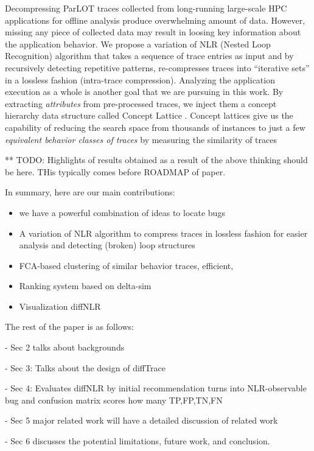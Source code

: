 %
Decompressing ParLOT traces collected from long-running large-scale HPC applications for offline analysis produce overwhelming amount of data. However, missing any piece of collected data may result in loosing key information about the application behavior.
%
We propose a variation of NLR (Nested Loop Recognition) algorithm \cite{Ketterlin-nlr} that takes a sequence of trace entries as input and by recursively detecting repetitive patterns, re-compresses traces into ``iterative sets'' in a lossless fashion (intra-trace compression).  
%
Analyzing the application execution as a whole is another goal that we are pursuing in this work. 
%
By extracting \textit{attributes} from pre-processed traces, we inject them a concept hierarchy data structure called Concept Lattice \cite{clbook}.  
%
Concept lattices give us the capability of reducing the search space from thousands of instances to just a few \textit{equivalent behavior classes of traces} by measuring the similarity of traces\cite{Alqadah2011}
% 

**   TODO: Highlights of results obtained as a result of the above thinking should be here. THis typically comes before ROADMAP of paper.

In summary, here are our main contributions:
\begin{itemize}
\item we have a powerful combination of ideas to locate bugs
\item A variation of NLR algorithm to compress traces in lossless fashion for easier analysis and detecting (broken) loop structures 
\item FCA-based clustering of similar behavior traces, efficient, 
\item Ranking system based on delta-sim
\item Visualization diffNLR
\end{itemize}

%

The rest of the paper is as follows:

- Sec 2 talks about backgrounds 

- Sec 3: Talks about the design of diffTrace

- Sec 4: Evaluates diffNLR by initial recommendation turns into NLR-observable bug and confusion matrix scores how many TP,FP,TN,FN

- Sec 5 major related work will have a detailed discussion of related work

- Sec 6 discusses the potential limitations, future work,  and conclusion.

